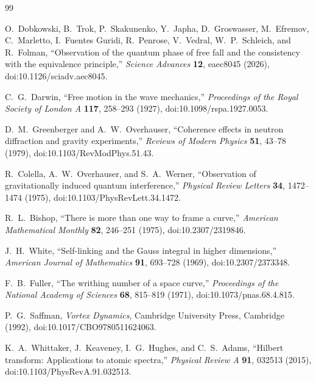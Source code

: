 \begin{thebibliography}{99}

O.~Dobkowski, B.~Trok, P.~Skakunenko, Y.~Japha, D.~Groswasser,
M.~Efremov, C.~Marletto, I.~Fuentes Guridi, R.~Penrose,
V.~Vedral, W.~P.~Schleich, and R.~Folman,
``Observation of the quantum phase of free fall and the consistency with the equivalence principle,''
\emph{Science Advances} \textbf{12}, eaec8045 (2026),
doi:10.1126/sciadv.aec8045.

C.~G.~Darwin,
``Free motion in the wave mechanics,''
\emph{Proceedings of the Royal Society of London A} \textbf{117}, 258--293 (1927),
doi:10.1098/rspa.1927.0053.

D.~M.~Greenberger and A.~W.~Overhauser,
``Coherence effects in neutron diffraction and gravity experiments,''
\emph{Reviews of Modern Physics} \textbf{51}, 43--78 (1979),
doi:10.1103/RevModPhys.51.43.

R.~Colella, A.~W.~Overhauser, and S.~A.~Werner,
``Observation of gravitationally induced quantum interference,''
\emph{Physical Review Letters} \textbf{34}, 1472--1474 (1975),
doi:10.1103/PhysRevLett.34.1472.

R.~L.~Bishop,
``There is more than one way to frame a curve,''
\emph{American Mathematical Monthly} \textbf{82}, 246--251 (1975),
doi:10.2307/2319846.

J.~H.~White,
``Self-linking and the Gauss integral in higher dimensions,''
\emph{American Journal of Mathematics} \textbf{91}, 693--728 (1969),
doi:10.2307/2373348.

F.~B.~Fuller,
``The writhing number of a space curve,''
\emph{Proceedings of the National Academy of Sciences} \textbf{68}, 815--819 (1971),
doi:10.1073/pnas.68.4.815.


P.~G.~Saffman,
\emph{Vortex Dynamics},
Cambridge University Press, Cambridge (1992),
doi:10.1017/CBO9780511624063.

K.~A.~Whittaker, J.~Keaveney, I.~G.~Hughes, and C.~S.~Adams,
``Hilbert transform: Applications to atomic spectra,''
\emph{Physical Review A} \textbf{91}, 032513 (2015),
doi:10.1103/PhysRevA.91.032513.

\end{thebibliography}
